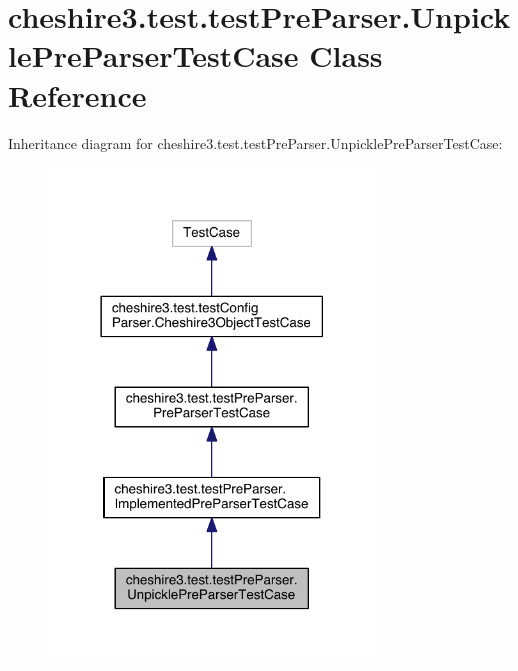\hypertarget{classcheshire3_1_1test_1_1test_pre_parser_1_1_unpickle_pre_parser_test_case}{\section{cheshire3.\-test.\-test\-Pre\-Parser.\-Unpickle\-Pre\-Parser\-Test\-Case Class Reference}
\label{classcheshire3_1_1test_1_1test_pre_parser_1_1_unpickle_pre_parser_test_case}
}


Inheritance diagram for cheshire3.\-test.\-test\-Pre\-Parser.\-Unpickle\-Pre\-Parser\-Test\-Case\-:
\nopagebreak
\begin{figure}[H]
\begin{center}
\leavevmode
\includegraphics[width=246pt]{classcheshire3_1_1test_1_1test_pre_parser_1_1_unpickle_pre_parser_test_case__inherit__graph}
\end{center}
\end{figure}


